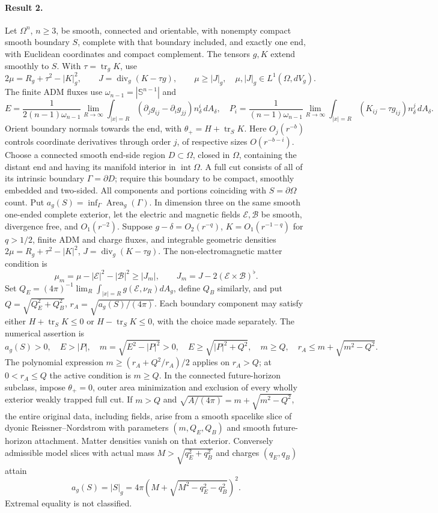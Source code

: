 \documentclass[11pt]{article}
\begin{document}
\paragraph{Result 2.} Let $\Omega^n$, $n\ge3$, be smooth, connected and orientable, with nonempty compact smooth boundary $S$, complete with that boundary included, and exactly one end, with Euclidean coordinates and compact complement. The tensors $g,K$ extend smoothly to $S$. With $\tau=\operatorname{tr}_gK$, use
\[
 2\mu=R_g+\tau^2-|K|_g^2,\qquad J=\operatorname{div}_g(K-\tau g),\qquad
 \mu\ge|J|_g,\quad\mu,|J|_g\in L^1(\Omega,dV_g).
\]
The finite ADM fluxes use $\omega_{n-1}=|\mathbb S^{n-1}|$ and
\[
 E=\frac1{2(n-1)\omega_{n-1}}\lim_{R\to\infty}\int_{|x|=R}
 (\partial_jg_{ij}-\partial_ig_{jj})n_\delta^i\,dA_\delta,\quad
 P_i=\frac1{(n-1)\omega_{n-1}}\lim_{R\to\infty}\int_{|x|=R}(K_{ij}-\tau g_{ij})n_\delta^j\,dA_\delta.
\]
Orient boundary normals towards the end, with $\theta_+=H+\operatorname{tr}_SK$. Here $O_j(r^{-b})$ controls coordinate derivatives through order $j$, of respective sizes $O(r^{-b-i})$. Choose a connected smooth end-side region $D\subset\Omega$, closed in $\Omega$, containing the distant end and having its manifold interior in $\operatorname{int}\Omega$. A full cut consists of all of its intrinsic boundary $\Gamma=\partial D$; require this boundary to be compact, smoothly embedded and two-sided. All components and portions coinciding with $S=\partial\Omega$ count. Put $a_g(S)=\inf_\Gamma\operatorname{Area}_g(\Gamma)$. In dimension three on the same smooth one-ended complete exterior, let the electric and magnetic fields $\mathcal E,\mathcal B$ be smooth, divergence free, and $O_1(r^{-2})$. Suppose $g-\delta=O_2(r^{-q})$, $K=O_1(r^{-1-q})$ for $q>1/2$, finite ADM and charge fluxes, and integrable geometric densities $2\mu=R_g+\tau^2-|K|^2$, $J=\operatorname{div}_g(K-\tau g)$. The non-electromagnetic matter condition is
\[
 \mu_m=\mu-|\mathcal E|^2-|\mathcal B|^2\ge|J_m|,\qquad
 J_m=J-2(\mathcal E\times\mathcal B)^\flat.
\]
Set $Q_E=(4\pi)^{-1}\lim_R\int_{|x|=R}g(\mathcal E,\nu_R)dA_g$, define $Q_B$ similarly, and put $Q=\sqrt{Q_E^2+Q_B^2}$, $r_A=\sqrt{a_g(S)/(4\pi)}$. Each boundary component may satisfy either $H+\operatorname{tr}_SK\le0$ or $H-\operatorname{tr}_SK\le0$, with the choice made separately. The numerical assertion is
\[
 a_g(S)>0,\quad E>|P|,\quad m=\sqrt{E^2-|P|^2}>0,\quad
 E\ge\sqrt{|P|^2+Q^2},\quad m\ge Q,\quad r_A\le m+\sqrt{m^2-Q^2}.
\]
The polynomial expression $m\ge(r_A+Q^2/r_A)/2$ applies on $r_A>Q$; at $0<r_A\le Q$ the active condition is $m\ge Q$. In the connected future-horizon subclass, impose $\theta_+=0$, outer area minimization and exclusion of every wholly exterior weakly trapped full cut. If $m>Q$ and $\sqrt{A/(4\pi)}=m+\sqrt{m^2-Q^2}$, the entire original data, including fields, arise from a smooth spacelike slice of dyonic Reissner--Nordstrom with parameters $(m,Q_E,Q_B)$ and smooth future-horizon attachment. Matter densities vanish on that exterior. Conversely admissible model slices with actual mass $M>\sqrt{q_E^2+q_B^2}$ and charges $(q_E,q_B)$ attain
\[
 a_g(S)=|S|_g=4\pi\left(M+\sqrt{M^2-q_E^2-q_B^2}\right)^2.
\]
Extremal equality is not classified.
\end{document}
